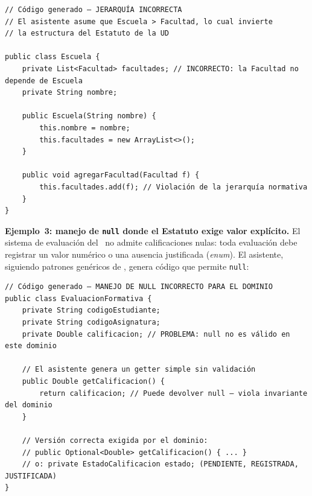 \begin{lstlisting}[style=javaStyle,
  caption={Jerarquía de unidades académicas invertida por el asistente generativo.
    La relación correcta, según el Acuerdo 004 de 2025, establece que la Facultad
    contiene Proyectos Curriculares y éstos se articulan con Escuelas, no al revés.},
  label={lst:jerarquia-invertida}]
// Código generado — JERARQUÍA INCORRECTA
// El asistente asume que Escuela > Facultad, lo cual invierte
// la estructura del Estatuto de la UD

public class Escuela {
    private List<Facultad> facultades; // INCORRECTO: la Facultad no depende de Escuela
    private String nombre;

    public Escuela(String nombre) {
        this.nombre = nombre;
        this.facultades = new ArrayList<>();
    }

    public void agregarFacultad(Facultad f) {
        this.facultades.add(f); // Violación de la jerarquía normativa
    }
}
\end{lstlisting}

\textbf{Ejemplo~3: manejo de \texttt{null} donde el Estatuto exige valor explícito.}
El sistema de evaluación del \acuerdo\ no admite calificaciones nulas: toda
evaluación debe registrar un valor numérico o una ausencia justificada (\textit{enum}).
El asistente, siguiendo patrones genéricos de \java, genera código que permite
\texttt{null}:

\begin{lstlisting}[style=javaStyle,
  caption={Uso de \texttt{null} donde el dominio estatutario exige un valor
    explícito. El patrón correcto emplea \texttt{Optional<Double>} o un tipo
    enumerado que represente la ausencia justificada de calificación.},
  label={lst:null-violacion}]
// Código generado — MANEJO DE NULL INCORRECTO PARA EL DOMINIO
public class EvaluacionFormativa {
    private String codigoEstudiante;
    private String codigoAsignatura;
    private Double calificacion; // PROBLEMA: null no es válido en este dominio

    // El asistente genera un getter simple sin validación
    public Double getCalificacion() {
        return calificacion; // Puede devolver null — viola invariante del dominio
    }

    // Versión correcta exigida por el dominio:
    // public Optional<Double> getCalificacion() { ... }
    // o: private EstadoCalificacion estado; (PENDIENTE, REGISTRADA, JUSTIFICADA)
}
\end{lstlisting}

